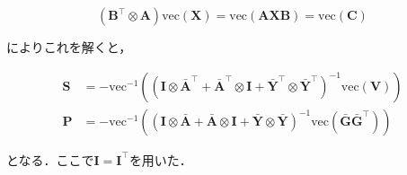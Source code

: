 $$
(\mathbf{B}^\top \otimes \mathbf{A})\text{vec}(\mathbf{X}) = \text{vec}(\mathbf{A}\mathbf{X}\mathbf{B})=\text{vec}(\mathbf{C})
$$

によりこれを解くと，

$$
\begin{aligned}
\mathbf{S} &= -\text{vec}^{-1}\left(\left(\mathbf{I} \otimes \bar{\mathbf{A}}^\top + \bar{\mathbf{A}}^\top \otimes \mathbf{I} + \bar{\mathbf{Y}}^\top \otimes \bar{\mathbf{Y}}^\top\right)^{-1}\text{vec}(\mathbf{V})\right)\\
\mathbf{P} &= -\text{vec}^{-1}\left(\left(\mathbf{I} \otimes \bar{\mathbf{A}} + \bar{\mathbf{A}} \otimes \mathbf{I} + \bar{\mathbf{Y}} \otimes \bar{\mathbf{Y}}\right)^{-1}\text{vec}(\bar{\mathbf{G}}\bar{\mathbf{G}}^\top)\right)
\end{aligned}
$$

となる．ここで$\mathbf{I}=\mathbf{I}^\top$を用いた．
